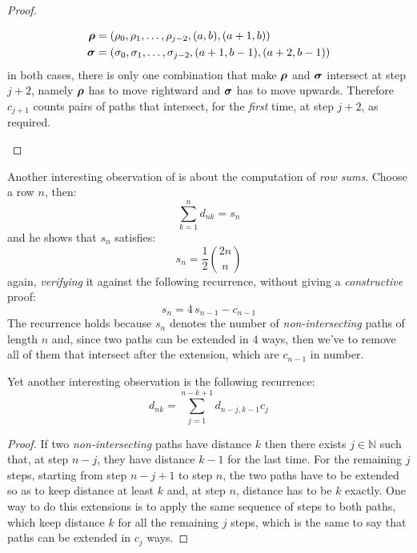 \begin{proof}
\begin{itemize}
\begin{displaymath}
                \begin{split}
                    \boldsymbol{\rho}&=(\rho_{0},\rho_{1},\ldots,\rho_{j-2},(a, b),(a+1, b))\\
                    \boldsymbol{\sigma}&=(\sigma_{0},\sigma_{1},\ldots,\sigma_{j-2},(a+1,b-1),(a+2, b-1))
                \end{split}
            \end{displaymath}
            in both cases, there is only one combination that make $\boldsymbol{\rho}$ and $\boldsymbol{\sigma}$
            intersect at step $j+2$, namely $\boldsymbol{\rho}$ has to move rightward and $\boldsymbol{\sigma}$
            has to move upwards. Therefore $c_{j+1}$ counts pairs of paths that intersect,
            for the \emph{first} time, at step $j+2$, as required.
            
                 
    \end{itemize}
\end{proof}

Another interesting observation of \citeauthor{shapiro:1976} is about the computation
of \emph{row sums}. Choose a row $n$, then: 
\begin{displaymath}
    \sum_{k=1}^{n}{d_{nk}}=s_{n}
\end{displaymath}
and he shows that $s_{n}$ satisfies:
\begin{displaymath}
    s_{n}=\frac{1}{2}{{2n}\choose{n}}
\end{displaymath}
again, \emph{verifying} it against the following recurrence, without giving a \emph{constructive} proof:
\begin{displaymath}
    s_{n}=4\,s_{n-1}-c_{n-1}
\end{displaymath}
The recurrence holds because $s_{n}$ denotes the number of
\emph{non-intersecting} paths of length $n$ and, since two paths can be
extended in $4$ ways, then we've to remove all of them that intersect after the
extension, which are $c_{n-1}$ in number.

Yet another interesting observation is the following recurrence:
\begin{displaymath}
    d_{nk}=\sum_{j=1}^{n-k+1}{d_{n-j,k-1}c_{j}}
\end{displaymath}

\begin{proof}
    If two \emph{non-intersecting} paths have distance $k$ then there
    exists $j\in\mathbb{N}$ such that, at step $n-j$, they have distance 
    $k-1$ for the last time. For the remaining $j$ steps, starting from
    step $n-j+1$ to step $n$, the two paths have to be extended so as to keep
    distance at least $k$ and, at step $n$, distance has to be $k$ exactly.
    One way to do this extensions is to apply the same sequence of steps to both paths,
    which keep distance $k$ for all the remaining $j$ steps, which is the same to say
    that paths can be extended in $c_{j}$ ways.
\end{proof}

